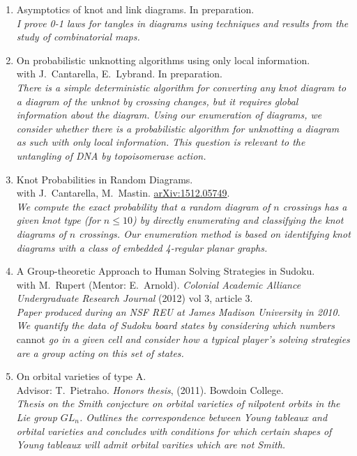 \documentclass[letterpaper]{article}
\begin{document}
\begin{enumerate}
\item Asymptotics of knot and link diagrams. In preparation.\\
  \textit{I prove 0-1 laws for tangles in diagrams using techniques
    and results from the study of combinatorial maps.}
\item On probabilistic unknotting algorithms using only local information.\\
  with J.\ Cantarella, E.\ Lybrand. In preparation.\\
  \textit{There is a simple deterministic algorithm for converting any
    knot diagram to a diagram of the unknot by crossing changes, but
    it requires global information about the diagram. Using our
    enumeration of diagrams, we consider whether there is a
    probabilistic algorithm for unknotting a diagram as such with only
    local information. This question is relevant to the untangling of
    DNA by topoisomerase action.}
\item Knot Probabilities in Random Diagrams.\\
  with J.\ Cantarella, M.\ Mastin. \href{http://arxiv.org/abs/1512.05749}{arXiv:1512.05749}.\\
  \textit{We compute the exact probability that a random diagram of
    $n$ crossings has a given knot type (for $n \leq 10$) by directly
    enumerating and classifying the knot diagrams of $n$
    crossings. Our enumeration method is based on identifying knot
    diagrams with a class of embedded 4-regular planar graphs.}
\item A Group-theoretic Approach to Human Solving Strategies in
  Sudoku.\\
  with M.\ Rupert (Mentor: E.\ Arnold). \textit{Colonial Academic
    Alliance
    Undergraduate Research Journal} (2012) vol 3, article 3.\\
  \textit{Paper produced during an NSF REU at James Madison University
    in 2010. We quantify the data of Sudoku board states by
    considering which numbers} cannot \textit{go in a given cell and
    consider how a typical player's solving strategies are a group
    acting on this set of states.}
\item On orbital varieties of type A. \\
  Advisor: T.\ Pietraho. \textit{Honors thesis}, (2011). Bowdoin
  College.\\
  \textit{Thesis on the Smith conjecture on orbital varieties of
    nilpotent orbits in the Lie group $GL_n$.  Outlines the
    correspondence between Young tableaux and orbital varieties and
    concludes with conditions for which certain shapes of Young
    tableaux will admit orbital varities which are not Smith.}
\end{enumerate}
\end{document}
